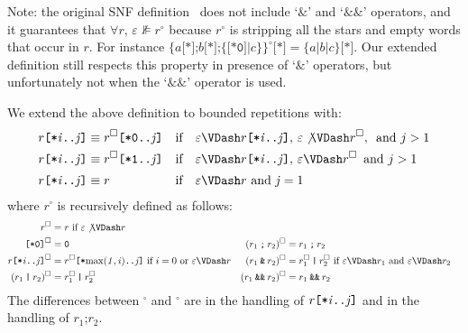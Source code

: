 \documentclass[a4paper,twoside,10pt,DIV=12]{scrreprt}
\newcommand{\OR}{\mathbin{\texttt{|}}}
\newcommand{\AND}{\mathbin{\texttt{\&}}}
\newcommand{\ANDALT}{\mathbin{\texttt{\&\&}}}
\newcommand{\CONCAT}{\mathbin{\texttt{;}}}
\newcommand{\0}{\texttt{0}}
\newcommand{\1}{\texttt{1}}
\newcommand{\STAR}[1]{\texttt{[*#1]}}
\newcommand{\PLUS}{\texttt{[+]}}
\newcommand{\eword}{\texttt{[*0]}}
\newcommand{\sere}[1]{\texttt{\{}#1\texttt{\}}}
\newcommand\mvar[1]{\ensuremath{\mathit{#1}}}
\newcommand\samp[1]{`\texttt{#1}'}
\begin{document}
Note: the original SNF definition~\cite{bruggeman.96.tcs} does not
include \samp{$\AND$} and \samp{$\ANDALT$} operators, and it
guarantees that $\forall r,\,\varepsilon\not\VDash r^\circ$ because
$r^\circ$ is stripping all the stars and empty words that occur in
$r$.  For instance $\sere{a\STAR{}\CONCAT
  b\STAR{}\CONCAT\sere{\eword\OR c}}^\circ\STAR{} = \sere{a\OR b\OR
  c}\STAR{}$.  Our extended definition still respects this property in
presence of \samp{$\AND$} operators, but unfortunately not when the
\samp{$\ANDALT$} operator is used.

We extend the above definition to bounded repetitions with:
\begin{align*}
  r\STAR{\mvar{i}..\mvar{j}} & \equiv r^\square\STAR{0..\mvar{j}}\quad\text{if}\quad\varepsilon\VDash r\STAR{\mvar{i}..\mvar{j}},\,\varepsilon\not\VDash r^\square,\,\text{~and~}j>1\\
  r\STAR{\mvar{i}..\mvar{j}} & \equiv r^\square\STAR{1..\mvar{j}}\quad\text{if}\quad\varepsilon\VDash r\STAR{\mvar{i}..\mvar{j}},\,\varepsilon\VDash r^\square\,\text{~and~}j>1\\
  r\STAR{\mvar{i}..\mvar{j}} & \equiv r\phantom{^\square\STAR{1..\mvar{j}}}\quad\text{if}\quad\varepsilon\VDash r\text{~and~}\mvar{j}=1
\end{align*}
where $r^\square$ is recursively defined as follows:
\begin{align*}
  r^\square &= r\text{~if~} \varepsilon\not\VDash r \\
  \eword^\square &= \0 &
  (r_1\CONCAT r_2)^\square &= r_1\CONCAT r_2\\
  r\STAR{\mvar{i}..\mvar{j}}^\square &= r^\square\STAR{\mvar{\max(1,i)}..\mvar{j}} \text{~if~} i=0 \text{~or~} \varepsilon\VDash r &
  (r_1\AND r_2)^\square &= r_1^\square\OR r_2^\square \text{~if~} \varepsilon\VDash r_1\text{~and~}\varepsilon\VDash r_2\\
  (r_1\OR r_2)^\square &= r_1^\square \OR r_2^\square &
  (r_1\ANDALT r_2)^\square &= r_1 \ANDALT r_2
\end{align*}
The differences between $^\square$ and $^\circ$ are in the handling
of $r\STAR{\mvar{i}..\mvar{j}}$ and in the handling of $r_1\CONCAT r_2$.


\end{document}

